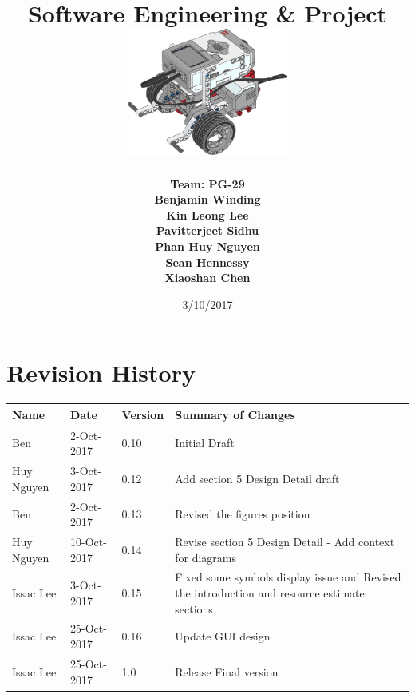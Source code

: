 \documentclass[10pt,a4paper,titlepage]{article}
\begin{document}
	
	\begin{titlepage}
		
		\title{
			\fontsize{50}{12}\\
			\vspace{20pt}
			\fontsize{20}{12}\\
			\vspace{10pt}
			\large{Software Engineering \& Project} \\
			\vspace{20pt}
			\includegraphics[width=200px]{title-page-ev3.png}					
		}
		\date{3/10/2017}
		\author{
			\bf{Team: PG-29} \\
			Benjamin Winding \\
			Kin Leong Lee \\
			Pavitterjeet Sidhu \\
			Phan Huy Nguyen \\
			Sean Hennessy \\
			Xiaoshan Chen \\
		}
		\maketitle
		
	\end{titlepage}
		 
	\tableofcontents	
	\listoffigures
	\listoftables
		
	\section*{Revision History}	
	\label{revtable}	
	\begin{tabular}{|p{2.1cm}|p{2.5cm}|p{2cm}|p{4.1cm}|}		
		\hline 
		\textbf {Name} & \textbf{Date} & \textbf {Version} &\textbf {Summary of Changes} \\ \hline
		Ben & 2-Oct-2017 & 0.10 & Initial Draft\\ 
		\hline	Huy Nguyen & 3-Oct-2017 & 0.12 & Add section 5 Design Detail draft\\ \hline
		Ben & 2-Oct-2017 & 0.13 & Revised the figures position\\ 
		\hline
		Huy Nguyen & 10-Oct-2017 & 0.14 & Revise section 5 Design Detail - Add context for diagrams\\ \hline
		Issac Lee & 3-Oct-2017 & 0.15 & Fixed some symbols display issue and Revised the introduction and resource estimate sections\\ \hline
		Issac Lee & 25-Oct-2017 & 0.16 & Update GUI design\\ \hline 
		Issac Lee & 25-Oct-2017 & 1.0 & Release Final version\\ \hline 
		
	\end{tabular}
\end{document}
